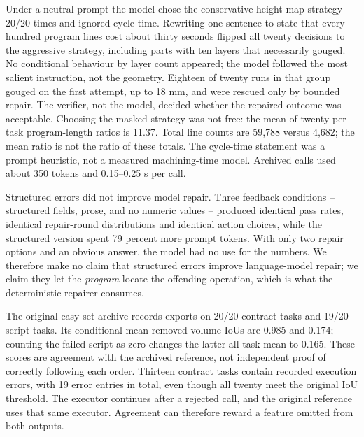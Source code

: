 Under a neutral prompt the model chose the conservative height-map strategy 20/20 times and ignored cycle time. Rewriting one sentence to state that every hundred program lines cost about thirty seconds flipped all twenty decisions to the aggressive strategy, including parts with ten layers that necessarily gouged. No conditional behaviour by layer count appeared; the model followed the most salient instruction, not the geometry. Eighteen of twenty runs in that group gouged on the first attempt, up to 18 mm, and were rescued only by bounded repair. The verifier, not the model, decided whether the repaired outcome was acceptable. Choosing the masked strategy was not free: the mean of twenty per-task program-length ratios is 11.37. Total line counts are 59,788 versus 4,682; the mean ratio is not the ratio of these totals. The cycle-time statement was a prompt heuristic, not a measured machining-time model. Archived calls used about 350 tokens and 0.15--0.25 s per call.

Structured errors did not improve model repair. Three feedback conditions -- structured fields, prose, and no numeric values -- produced identical pass rates, identical repair-round distributions and identical action choices, while the structured version spent 79 percent more prompt tokens. With only two repair options and an obvious answer, the model had no use for the numbers. We therefore make no claim that structured errors improve language-model repair; we claim they let the \emph{program} locate the offending operation, which is what the deterministic repairer consumes.

The original easy-set archive records exports on 20/20 contract tasks and 19/20 script tasks. Its conditional mean removed-volume IoUs are 0.985 and 0.174; counting the failed script as zero changes the latter all-task mean to 0.165. These scores are agreement with the archived reference, not independent proof of correctly following each order. Thirteen contract tasks contain recorded execution errors, with 19 error entries in total, even though all twenty meet the original IoU threshold. The executor continues after a rejected call, and the original reference uses that same executor. Agreement can therefore reward a feature omitted from both outputs.

